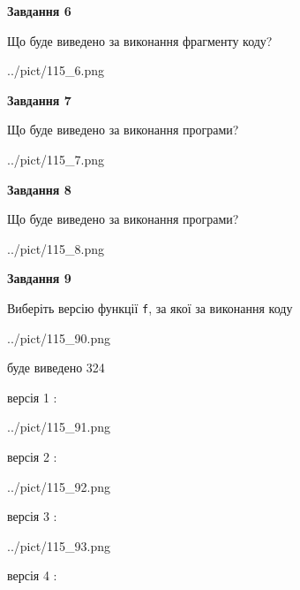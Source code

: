 \documentclass[12pt, ukrainian]{article}
\def\code#1{\Verb!#1!}
\begin{document}
{\begin {large}
{\begin {center}\textbf{Завдання 6}\end {center}}

Що буде виведено за виконання фрагменту коду?\par
\begin{center}
	{../pict/115_6.png}
\end{center}
\newpage

{\begin {center}\textbf{Завдання 7}\end {center}}

Що буде виведено за виконання програми?\par
\begin{center}
	{../pict/115_7.png}
\end{center}
\newpage

{\begin {center}\textbf{Завдання 8}\end {center}}

Що буде виведено за виконання програми?\par
\begin{center}
	{../pict/115_8.png}
\end{center}
\newpage

{\begin {center}\textbf{Завдання 9}\end {center}}

Виберіть версію функції \code{f}, за якої за виконання коду
\begin{center}
	{../pict/115_90.png}
\end{center}
буде виведено 324

\vspace{5mm}
версія 1 :

\begin{center}
	{../pict/115_91.png}
\end{center}
версія 2 :

\begin{center}
	{../pict/115_92.png}
\end{center}
версія 3 :

\begin{center}
	{../pict/115_93.png}
\end{center}
версія 4 :


\end{large}}
\end{document}
